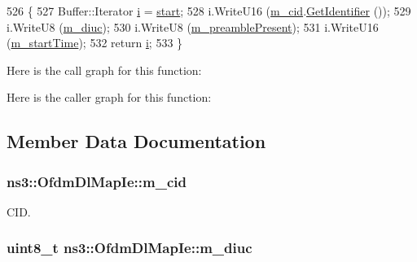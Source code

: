 \begin{DoxyCode}
526 \{
527   Buffer::Iterator \hyperlink{bernuolliDistribution_8m_a6f6ccfcf58b31cb6412107d9d5281426}{i} = \hyperlink{namespacevisualizer_1_1core_a2a35e5d8a34af358b508dac8635754e0}{start};
528   i.WriteU16 (\hyperlink{classns3_1_1OfdmDlMapIe_a449506430dde266b5a31461243c85116}{m\_cid}.\hyperlink{classns3_1_1Cid_a8745a5cf5b7f2e5d142c4fb79072a053}{GetIdentifier} ());
529   i.WriteU8 (\hyperlink{classns3_1_1OfdmDlMapIe_af9ab0f7049e9a6efb1d48ac02e4c09a8}{m\_diuc});
530   i.WriteU8 (\hyperlink{classns3_1_1OfdmDlMapIe_a313d26870dfa890bb0246cad2c268a83}{m\_preamblePresent});
531   i.WriteU16 (\hyperlink{classns3_1_1OfdmDlMapIe_a4d54e49b6f8867735059cd476c228cac}{m\_startTime});
532   \textcolor{keywordflow}{return} \hyperlink{bernuolliDistribution_8m_a6f6ccfcf58b31cb6412107d9d5281426}{i};
533 \}
\end{DoxyCode}


Here is the call graph for this function\+:




Here is the caller graph for this function\+:




\subsection{Member Data Documentation}
\subsubsection[{\texorpdfstring{m\+\_\+cid}{m_cid}}]{ ns3\+::\+Ofdm\+Dl\+Map\+Ie\+::m\+\_\+cid\hspace{0.3cm}{\ttfamily [private]}}\hypertarget{classns3_1_1OfdmDlMapIe_a449506430dde266b5a31461243c85116}{}\label{classns3_1_1OfdmDlMapIe_a449506430dde266b5a31461243c85116}


C\+ID. 

\subsubsection[{\texorpdfstring{m\+\_\+diuc}{m_diuc}}]{\setlength{\rightskip}{0pt plus 5cm}uint8\+\_\+t ns3\+::\+Ofdm\+Dl\+Map\+Ie\+::m\+\_\+diuc\hspace{0.3cm}{\ttfamily [private]}}\hypertarget{classns3_1_1OfdmDlMapIe_af9ab0f7049e9a6efb1d48ac02e4c09a8}{}\label{classns3_1_1OfdmDlMapIe_af9ab0f7049e9a6efb1d48ac02e4c09a8}


